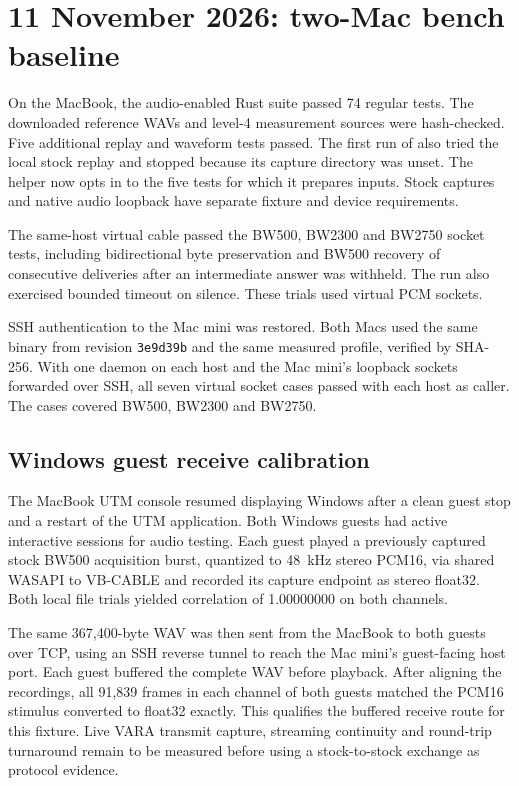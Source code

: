 \documentclass[11pt,a4paper]{article}
\newcommand{\pathtext}[1]{\path{#1}}
\begin{document}
\section{11 November 2026: two-Mac bench baseline}

On the MacBook, the audio-enabled Rust suite passed 74 regular
tests. The downloaded reference WAVs and level-4 measurement
sources were hash-checked. Five additional replay and waveform
tests passed.
The first run of \pathtext{tools/test-modem.py} also tried the local
stock replay and stopped because its capture directory was unset.
The helper now opts in to the five tests for which it prepares
inputs. Stock captures and native audio loopback have separate
fixture and device requirements.

The same-host virtual cable passed the BW500, BW2300 and BW2750
socket tests, including bidirectional byte preservation and BW500
recovery of consecutive deliveries after an intermediate answer
was withheld. The run also exercised bounded timeout on silence.
These trials used virtual PCM sockets.

SSH authentication to the Mac mini was restored. Both Macs used
the same binary from revision \texttt{3e9d39b} and the same measured
profile, verified by SHA-256. With one daemon on each host and the
Mac mini's loopback sockets forwarded over SSH, all seven virtual
socket cases passed with each host as caller. The cases covered
BW500, BW2300 and BW2750.

\subsection{Windows guest receive calibration}

The MacBook UTM console resumed displaying Windows after a clean
guest stop and a restart of the UTM application. Both Windows guests
had active interactive sessions for audio testing. Each guest played
a previously captured stock BW500 acquisition burst, quantized to
48~kHz stereo PCM16, via shared WASAPI to VB-CABLE and recorded its
capture endpoint as stereo float32. Both local file trials yielded
correlation of 1.00000000 on both channels.

The same 367,400-byte WAV was then sent from the MacBook to both
guests over TCP, using an SSH reverse tunnel to reach the Mac mini's
guest-facing host port. Each guest buffered the complete WAV before
playback. After aligning the recordings, all 91,839 frames in each
channel of both guests matched the PCM16 stimulus converted to
float32 exactly. This qualifies the buffered receive route for this
fixture. Live VARA transmit capture, streaming continuity and
round-trip turnaround remain to be measured before using a
stock-to-stock exchange as protocol evidence.
\end{document}

